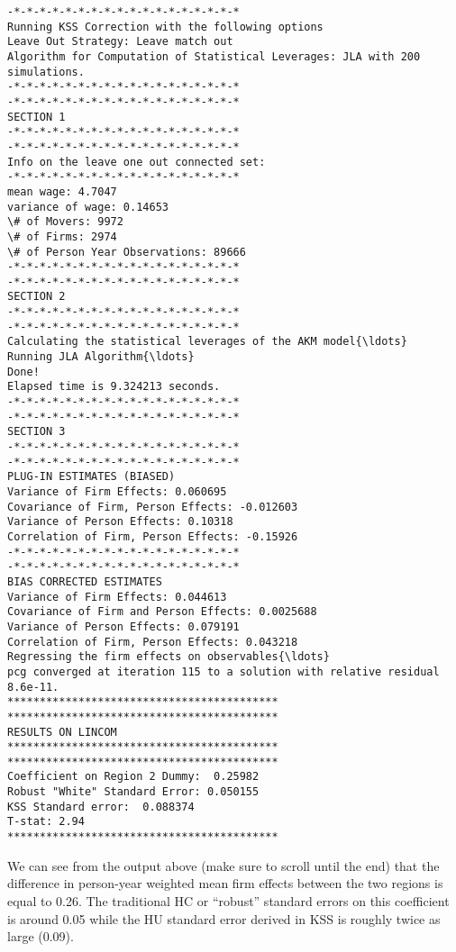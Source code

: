 \documentclass[11pt]{article}
\begin{document}
    \begin{Verbatim}[commandchars=\\\{\}]
-*-*-*-*-*-*-*-*-*-*-*-*-*-*-*-*-*-*
Running KSS Correction with the following options
Leave Out Strategy: Leave match out
Algorithm for Computation of Statistical Leverages: JLA with 200 simulations.
-*-*-*-*-*-*-*-*-*-*-*-*-*-*-*-*-*-*
-*-*-*-*-*-*-*-*-*-*-*-*-*-*-*-*-*-*
SECTION 1
-*-*-*-*-*-*-*-*-*-*-*-*-*-*-*-*-*-*
-*-*-*-*-*-*-*-*-*-*-*-*-*-*-*-*-*-*
Info on the leave one out connected set:
-*-*-*-*-*-*-*-*-*-*-*-*-*-*-*-*-*-*
mean wage: 4.7047
variance of wage: 0.14653
\# of Movers: 9972
\# of Firms: 2974
\# of Person Year Observations: 89666
-*-*-*-*-*-*-*-*-*-*-*-*-*-*-*-*-*-*
-*-*-*-*-*-*-*-*-*-*-*-*-*-*-*-*-*-*
SECTION 2
-*-*-*-*-*-*-*-*-*-*-*-*-*-*-*-*-*-*
-*-*-*-*-*-*-*-*-*-*-*-*-*-*-*-*-*-*
Calculating the statistical leverages of the AKM model{\ldots}
Running JLA Algorithm{\ldots}
Done!
Elapsed time is 9.324213 seconds.
-*-*-*-*-*-*-*-*-*-*-*-*-*-*-*-*-*-*
-*-*-*-*-*-*-*-*-*-*-*-*-*-*-*-*-*-*
SECTION 3
-*-*-*-*-*-*-*-*-*-*-*-*-*-*-*-*-*-*
-*-*-*-*-*-*-*-*-*-*-*-*-*-*-*-*-*-*
PLUG-IN ESTIMATES (BIASED)
Variance of Firm Effects: 0.060695
Covariance of Firm, Person Effects: -0.012603
Variance of Person Effects: 0.10318
Correlation of Firm, Person Effects: -0.15926
-*-*-*-*-*-*-*-*-*-*-*-*-*-*-*-*-*-*
-*-*-*-*-*-*-*-*-*-*-*-*-*-*-*-*-*-*
BIAS CORRECTED ESTIMATES
Variance of Firm Effects: 0.044613
Covariance of Firm and Person Effects: 0.0025688
Variance of Person Effects: 0.079191
Correlation of Firm, Person Effects: 0.043218
Regressing the firm effects on observables{\ldots}
pcg converged at iteration 115 to a solution with relative residual 8.6e-11.
******************************************
******************************************
RESULTS ON LINCOM
******************************************
******************************************
Coefficient on Region 2 Dummy:  0.25982
Robust "White" Standard Error: 0.050155
KSS Standard error:  0.088374
T-stat: 2.94
******************************************
    \end{Verbatim}

    We can see from the output above (make sure to scroll until the end)
that the difference in person-year weighted mean firm effects between
the two regions is equal to 0.26. The traditional
HC or ``robust'' standard errors on this
coefficient is around 0.05 while the HU standard error derived in KSS is
roughly twice as large (0.09).


    
    
    
\end{document}
